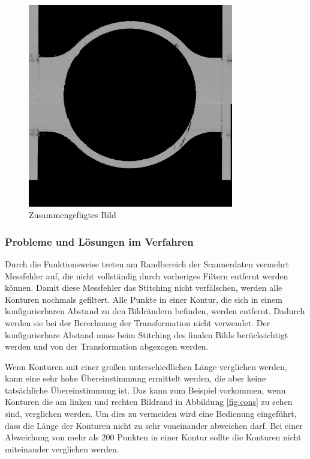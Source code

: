 \documentclass[../main.tex]{subfiles}
\begin{document}
\begin{figure}[h]
    \centering
    \includegraphics[width=0.8\textwidth]{images/AM_SP0_stitched_2.png} %
    \caption{Zusammengefügtes Bild}
    \label{fig:stitched_image}
\end{figure}

\subsubsection*{Probleme und Lösungen im Verfahren}

Durch die Funktionsweise treten am Randbereich der Scannerdaten vermehrt Messfehler auf, 
die nicht vollständig durch vorheriges Filtern entfernt werden können. 
Damit diese Messfehler das Stitching nicht verfälschen, werden alle Konturen nochmals 
gefiltert. Alle Punkte in einer Kontur, die sich in einem konfigurierbaren 
Abstand zu den Bildrändern befinden, werden entfernt. Dadurch werden sie bei der 
Berechnung der Transformation nicht verwendet. 
Der konfigurierbare Abstand muss beim Stitching des finalen Bilds berücksichtigt 
werden und von der Transformation abgezogen werden.

Wenn Konturen mit einer großen unterschiedlichen Länge verglichen werden, 
kann eine sehr hohe Übereinstimmung ermittelt werden, die aber keine 
tatsächliche Übereinstimmung ist. Das kann zum Beispiel vorkommen, wenn Konturen 
die am linken und rechten Bildrand in Abbildung \ref{fig:cons} zu sehen sind, 
verglichen werden. Um dies zu vermeiden wird eine Bedienung eingeführt, dass die Länge
der Konturen nicht zu sehr voneinander abweichen darf. Bei einer Abweichung von mehr als
200 Punkten in einer Kontur sollte die Konturen nicht miteinander verglichen werden.
\end{document}
